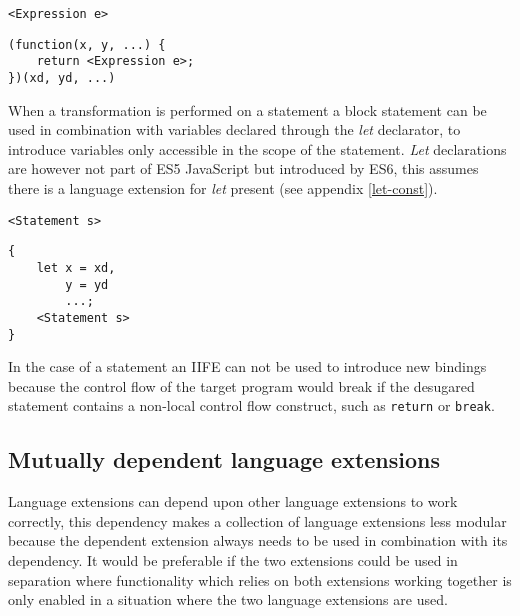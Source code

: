 \begin{minipage}{0.45\linewidth}
\begin{lstlisting}
<Expression e>
\end{lstlisting}
\end{minipage}
\hfill
\begin{minipage}{0.45\linewidth}
\begin{lstlisting}
(function(x, y, ...) {
	return <Expression e>;
})(xd, yd, ...)
\end{lstlisting}
\end{minipage}

When a transformation is performed on a statement a block statement can be used in combination with variables declared through the \textit{let} declarator, to introduce variables only accessible in the scope of the statement. \textit{Let} declarations are however not part of ES5 JavaScript but introduced by ES6, this assumes there is a language extension for \textit{let} present (see appendix \ref{let-const}).

\begin{minipage}{0.45\linewidth}
\begin{lstlisting}
<Statement s>
\end{lstlisting}
\end{minipage}
\hfill
\begin{minipage}{0.45\linewidth}
\begin{lstlisting}
{
	let x = xd,
		y = yd
		...;
	<Statement s>
}
\end{lstlisting}
\end{minipage}

In the case of a statement an IIFE can not be used to introduce new bindings because the control flow of the target program would break if the desugared statement contains a non-local control flow construct, such as \lstinline$return$ or \lstinline$break$. 

\subsection{Mutually dependent language extensions} \label{par:combined-extensions}
Language extensions can depend upon other language extensions to work correctly, this dependency makes a collection of language extensions less modular because the dependent extension always needs to be used in combination with its dependency. It would be preferable if the two extensions could be used in separation where functionality which relies on both extensions working together is only enabled in a situation where the two language extensions are used.

